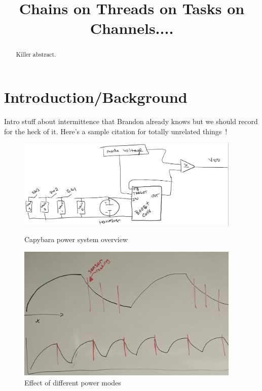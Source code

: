 \documentclass[11pt]{sensys-proc}
\title{Chains on Threads on Tasks on Channels....}
\begin{document}
\maketitle

\begin{abstract}
Killer abstract.
\end{abstract}

\section{Introduction/Background}
  \label{sec:intro}
Intro stuff about intermittence that Brandon already knows but we should record for the
heck of it. Here's a sample citation for totally unrelated things~\cite{RC,Grace}!

\begin{figure}
\centering
\begin{minipage}[b]{0.49\textwidth}
  \includegraphics[width=0.95\textwidth,center]{capybara-all.png}
\caption{Capybara power system overview}\label{label-a}
\end{minipage}\hfill
\begin{minipage}[b]{0.49\textwidth}
  \includegraphics[width=0.95\textwidth,center]{power_modes.pdf}
\caption{Effect of different power modes}\label{label-b}
\end{minipage}
\end{figure}
\end{document}
